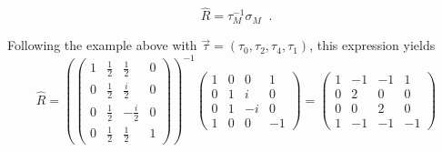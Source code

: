 $$
\hat{R} = \tau_M^{-1}\sigma_M\;\;.
$$
\begin{example}
Following the example above with $\vec{\tau} = (\tau_0,\tau_2,\tau_4,\tau_1)$, this expression yields
$$
\hat{R} = \left(\begin{pmatrix}
1 & \frac{1}{2} & \frac{1}{2} & 0 \\
 0 & \frac{1}{2} & \frac{i}{2} & 0 \\
 0 & \frac{1}{2} & -\frac{i}{2} & 0 \\
 0 & \frac{1}{2} & \frac{1}{2} & 1
\end{pmatrix}\right)^{-1}\begin{pmatrix}
 1 & 0 & 0 & 1 \\
 0 & 1 & i & 0 \\
 0 & 1 & -i & 0 \\
 1 & 0 & 0 & -1
\end{pmatrix} = \begin{pmatrix}
 1 & -1 & -1 & 1 \\
 0 & 2 & 0 & 0 \\
 0 & 0 & 2 & 0 \\
 1 & -1 & -1 & -1
\end{pmatrix}
$$
\end{example}

